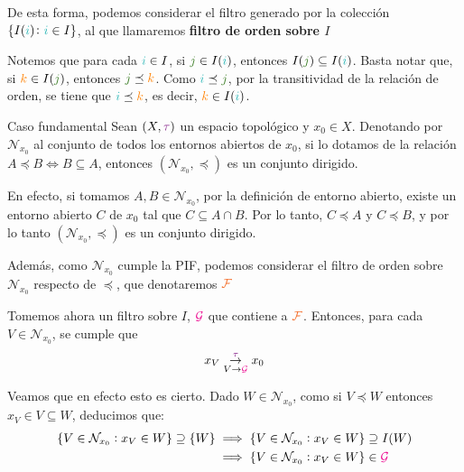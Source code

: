 \documentclass[titlepage,11pt,a4paper]{book}
\newcommand{\filt}{\ensuremath{\textcolor{Orange}{\mathcal{F}}}}
\newcommand{\gilt}{\ensuremath{\textcolor{Magenta}{\mathcal{G}}}}
\newcommand{\ii}{\ensuremath{\textcolor{TealBlue}{i}}}
\newcommand{\jj}{\ensuremath{\textcolor{OliveGreen}{j}}}
\newcommand{\taut}{\textcolor{Fuchsia}{\tau}}
\newcommand{\kk}{\textcolor{orange}{k}}
\begin{document}
    \smallskip
    De esta forma, podemos considerar el filtro generado por la colección $\{I(\ii) \colon \ii \in I\}$, al que llamaremos \textbf{filtro de orden sobre $I$}

    \begin{rem*}{}
    Notemos que para cada $\ii \in I$, si $\jj \in I(\ii)$, entonces $I(\jj) \subseteq I(\ii)$. Basta notar que, si $\kk \in I(\jj)$, entonces $\jj \preceq \kk$. Como $\ii \preceq \jj$, por la transitividad de la relación de orden, se tiene que $\ii \preceq \kk$, es decir, $\kk \in I(\ii)$.
    \end{rem*}

    \begin{ejemplo*}{Caso fundamental}
        Sean $(X, \taut)$ un espacio topológico y $x_{0} \in X$. Denotando por $\mathcal{N}_{x_0}$ al conjunto de todos los entornos abiertos de $x_{0}$, si lo dotamos de la relación $A \preceq B \Leftrightarrow B \subseteq A$, entonces $(\mathcal{N}_{x_0}, \preceq)$ es un conjunto dirigido.
        
        \smallskip
        En efecto, si tomamos $A, B \in \mathcal{N}_{x_0}$, por la definición de entorno abierto, existe un entorno abierto $C$ de $x_{0}$ tal que $C \subseteq A \cap B$. Por lo tanto, $C \preceq A$ y $C \preceq B$, y por lo tanto $(\mathcal{N}_{x_0}, \preceq)$ es un conjunto dirigido.

        \smallskip
        Además, como $\mathcal{N}_{x_0}$ cumple la PIF, podemos considerar el filtro de orden sobre $\mathcal{N}_{x_0}$ respecto de $\preceq$, que denotaremos $\filt$

        \medskip
        Tomemos ahora un filtro sobre $I$, $\gilt$ que contiene a $\filt$. Entonces, para cada $V \in \mathcal{N}_{x_0}$, se cumple que
        \[
        x_{V} \underset{V \to \gilt}{\overset{\taut}{\to}} x_{0}
        \]

        \medskip
        Veamos que en efecto esto es cierto. Dado $W \in \mathcal{N}_{x_0}$, como si $V \preceq W$ entonces $x_{V} \in V \subseteq W$, deducimos que:
        \[
        \begin{aligned}
            \{V \in \mathcal{N}_{x_0} : x_{V} \in W\} \supseteq \{W\} &\implies \{V \in \mathcal{N}_{x_0} : x_{V} \in W\} \supseteq I(W) \\
            &\implies \{V \in \mathcal{N}_{x_0} : x_{V} \in W\} \in \gilt
        \end{aligned}
        \]
    \end{ejemplo*}
\end{document}
